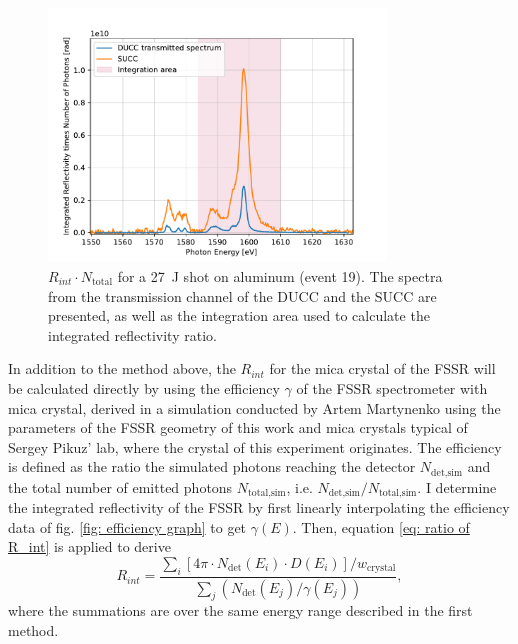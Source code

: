 \begin{figure}[H]
	\centering
	\includegraphics[width=0.8\textwidth]{Data_Analysis/R_int_ratio/spectra_of_Al_event_19_transmitted.pdf}
	\caption{$R_{int}\cdot N_\text{{total}}$ for a \SI{27}{\joule} shot on aluminum (event 19). The spectra from the transmission channel of the DUCC and the SUCC are presented, as well as the integration area used to calculate the integrated reflectivity ratio.}
	\label{fig: R_int DUCC_t}
\end{figure}

In addition to the method above, the $R_{int}$ for the mica crystal of the FSSR will be calculated directly by using the efficiency $\gamma$ of the FSSR spectrometer with mica crystal, derived in a simulation conducted by Artem Martynenko using the parameters of the FSSR geometry of this work and mica crystals typical of Sergey Pikuz' lab, where the crystal of this experiment originates. The efficiency is defined as the ratio the simulated photons reaching the detector $N_{\text{det,sim}}$ and the total number of emitted photons $N_{\text{total,sim}}$, i.e. $N_{\text{det,sim}}/N_{\text{total,sim}}$. I determine the integrated reflectivity of the FSSR by first linearly interpolating the efficiency data of fig. \ref{fig: efficiency graph} to get $\gamma(E)$. Then, equation \ref{eq: ratio of R_int} is applied to derive
\begin{equation}
	R_{int} = \frac{\sum_{i}[4\pi\cdot N_{\text{det}}(E_i)\cdot D(E_i)]/w_{\text{crystal}}}{\sum_{j}(N_{\text{det}}(E_j)/\gamma(E_j))},
\end{equation}
where the summations are over the same energy range described in the first method.



